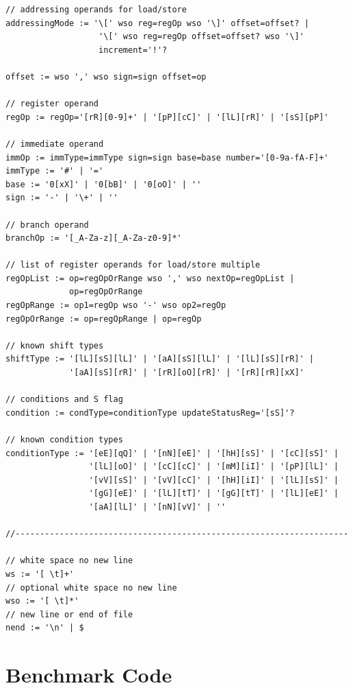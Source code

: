 \documentclass[a4paper, 11pt, onecolumn]{article}
\begin{document}
\begin{lstlisting}[basicstyle=\ttfamily\footnotesize]
// addressing operands for load/store
addressingMode := '\[' wso reg=regOp wso '\]' offset=offset? |
                   '\[' wso reg=regOp offset=offset? wso '\]'
                   increment='!'?
                   
offset := wso ',' wso sign=sign offset=op

// register operand
regOp := regOp='[rR][0-9]+' | '[pP][cC]' | '[lL][rR]' | '[sS][pP]'

// immediate operand
immOp := immType=immType sign=sign base=base number='[0-9a-fA-F]+'
immType := '#' | '='
base := '0[xX]' | '0[bB]' | '0[oO]' | ''
sign := '-' | '\+' | ''

// branch operand
branchOp := '[_A-Za-z][_A-Za-z0-9]*'

// list of register operands for load/store multiple
regOpList := op=regOpOrRange wso ',' wso nextOp=regOpList |
             op=regOpOrRange
regOpRange := op1=regOp wso '-' wso op2=regOp
regOpOrRange := op=regOpRange | op=regOp

// known shift types
shiftType := '[lL][sS][lL]' | '[aA][sS][lL]' | '[lL][sS][rR]' |
             '[aA][sS][rR]' | '[rR][oO][rR]' | '[rR][rR][xX]'

// conditions and S flag
condition := condType=conditionType updateStatusReg='[sS]'?

// known condition types
conditionType := '[eE][qQ]' | '[nN][eE]' | '[hH][sS]' | '[cC][sS]' |
                 '[lL][oO]' | '[cC][cC]' | '[mM][iI]' | '[pP][lL]' |
                 '[vV][sS]' | '[vV][cC]' | '[hH][iI]' | '[lL][sS]' |
                 '[gG][eE]' | '[lL][tT]' | '[gG][tT]' | '[lL][eE]' |
                 '[aA][lL]' | '[nN][vV]' | ''

//--------------------------------------------------------------------

// white space no new line 
ws := '[ \t]+'
// optional white space no new line 
wso := '[ \t]*'
// new line or end of file
nend := '\n' | $
\end{lstlisting}

\section{Benchmark Code}
\end{document}
